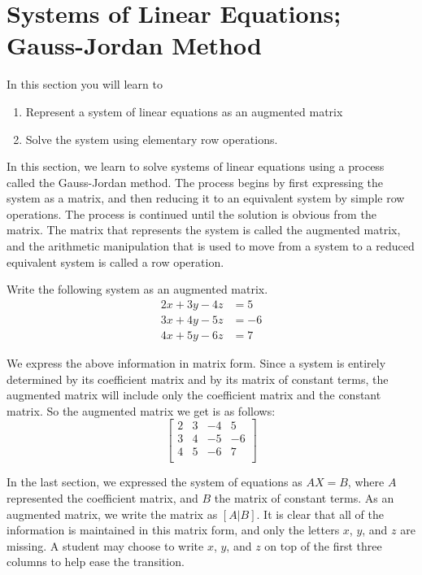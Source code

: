 \section{Systems of Linear Equations; Gauss-Jordan Method}
In this section you will learn to
\begin{enumerate}
    \item Represent a system of linear equations as an augmented matrix
    \item Solve the system using elementary row operations.
\end{enumerate}
In this section, we learn to solve systems of linear equations using a process called the Gauss-Jordan method. The process begins by first expressing the system as a matrix, and then reducing it to an equivalent system by simple row operations. The process is continued until the solution is obvious from the matrix. The matrix that represents the system is called the augmented matrix, and the arithmetic manipulation that is used to move from a system to a reduced equivalent system is called a row operation.

\begin{example}
    Write the following system as an augmented matrix.
    \begin{align*}
        2x + 3y - 4z & = 5  \\
        3x + 4y - 5z & = -6 \\
        4x + 5y - 6z & = 7
    \end{align*}
\end{example}
\begin{solution}
    We express the above information in matrix form. Since a system is entirely determined by its coefficient matrix and by its matrix of constant terms, the augmented matrix will include only the coefficient matrix and the constant matrix. So the augmented matrix we get is as follows:
    \[
        \left[
            \begin{array}{ccc|c}
                2 & 3 & -4 & 5  \\
                3 & 4 & -5 & -6 \\
                4 & 5 & -6 & 7  \\
            \end{array}
            \right]
    \]
\end{solution}

In the last section, we expressed the system of equations as $AX = B$, where $A$ represented the coefficient matrix, and $B$ the matrix of constant terms. As an augmented matrix, we write the matrix as $[ A | B]$. It is clear that all of the information is maintained in this matrix form, and only the letters $x$, $y$, and $z$ are missing. A student may choose to write $x$, $y$, and $z$ on top of the first three columns to help ease the transition.

